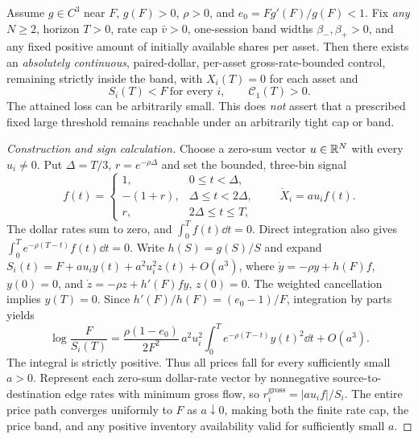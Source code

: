 \documentclass[review,hidelinks,onefignum,onetabnum]{siamonline250211}
\begin{document}
\begin{theorem}\label{thm:finite-rate-construct}
Assume $g\in C^3$ near $F$, $g(F)>0$, $\rho>0$, and $e_0=Fg'(F)/g(F)<1$. Fix \emph{any} $N\ge2$, horizon $T>0$, rate cap $\bar v>0$, one-session band widths $\beta_-,\beta_+>0$, and any fixed positive amount of initially available shares per asset. Then there exists an \emph{absolutely continuous}, paired-dollar, per-asset gross-rate-bounded control, remaining strictly inside the band, with $X_i(T)=0$ for each asset and
\begin{equation}\label{eq:local-speed-crash}
 \boxed{\ S_i(T)<F\ \text{for every }i,\qquad \mathcal C_1(T)>0.\ }
\end{equation}
The attained loss can be arbitrarily small. This does \emph{not} assert that a prescribed fixed large threshold remains reachable under an arbitrarily tight cap or band.
\end{theorem}
\begin{proof}[Construction and sign calculation]
Choose a zero-sum vector $u\in\mathbb{R}^N$ with every $u_i\ne0$. Put $\Delta=T/3$, $r=e^{-\rho\Delta}$ and set the bounded, three-bin signal
\begin{equation}\label{eq:bounded-control}
 f(t)=
 \begin{cases}
 1,&0\le t<\Delta,\\
 -(1+r),&\Delta\le t<2\Delta,\\
 r,&2\Delta\le t\le T,
 \end{cases}
 \qquad \dot X_i=a u_i f(t).
\end{equation}
The dollar rates sum to zero, and $\int_0^T f(t)\dd t=0$.
\linebreak Direct integration also gives $\int_0^T e^{-\rho(T-t)}f(t)\dd t=0$.
Write $h(S)=g(S)/S$ and expand
$S_i(t)=F+a u_i y(t)+a^2u_i^2 z(t)+O(a^3)$,
where $\dot y=-\rho y+h(F)f$, $y(0)=0$, and
$\dot z=-\rho z+h'(F)f y$, $z(0)=0$.
The weighted cancellation implies $y(T)=0$. Since $h'(F)/h(F)=(e_0-1)/F$, integration by parts yields
\begin{equation}\label{eq:finite-rate-coefficient}
 \boxed{\ \log\frac{F}{S_i(T)}=
 \frac{\rho(1-e_0)}{2F^2}\,a^2u_i^2
 \int_0^T e^{-\rho(T-t)}y(t)^2\dd t+O(a^3).\ }
\end{equation}
The integral is strictly positive. Thus all prices fall for every sufficiently small $a>0$. Represent each zero-sum dollar-rate vector by nonnegative source-to-destination edge rates with minimum gross flow, so $r_i^{\mathrm{gross}}=|a u_i f|/S_i$. The entire price path converges uniformly to $F$ as $a\downarrow0$, making both the finite rate cap, the price band, and any positive inventory availability valid for sufficiently small $a$.
\end{proof}
\end{document}
